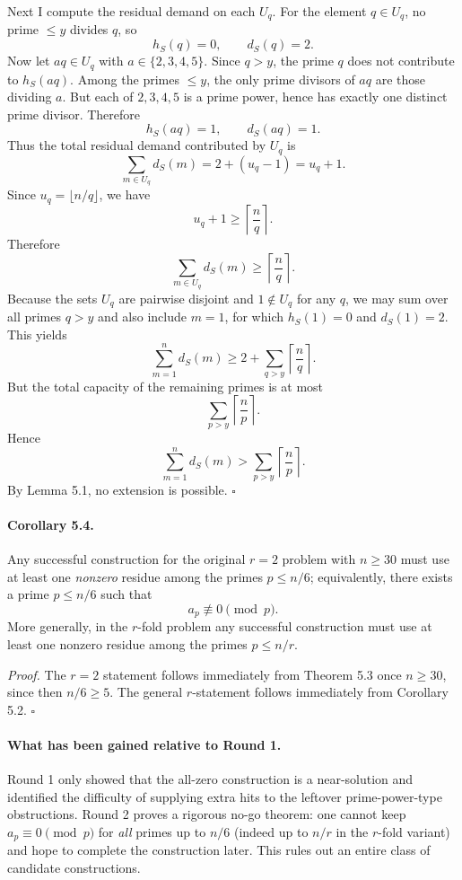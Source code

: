 Next I compute the residual demand on each \(U_q\).
For the element \(q\in U_q\), no prime \(\le y\) divides \(q\), so
\[
h_S(q)=0,
\qquad d_S(q)=2.
\]
Now let \(aq\in U_q\) with \(a\in\{2,3,4,5\}\).
Since \(q>y\), the prime \(q\) does not contribute to \(h_S(aq)\).
Among the primes \(\le y\), the only prime divisors of \(aq\) are those dividing \(a\).
But each of \(2,3,4,5\) is a prime power, hence has exactly one distinct prime divisor.
Therefore
\[
h_S(aq)=1,
\qquad d_S(aq)=1.
\]
Thus the total residual demand contributed by \(U_q\) is
\[
\sum_{m\in U_q} d_S(m)=2+(u_q-1)=u_q+1.
\]
Since \(u_q=\lfloor n/q\rfloor\), we have
\[
u_q+1\ge \left\lceil\frac{n}{q}\right\rceil.
\]
Therefore
\[
\sum_{m\in U_q} d_S(m)
\ge
\left\lceil\frac{n}{q}\right\rceil.
\]
Because the sets \(U_q\) are pairwise disjoint and \(1\notin U_q\) for any \(q\), we may sum over all primes \(q>y\) and also include \(m=1\), for which \(h_S(1)=0\) and \(d_S(1)=2\). This yields
\[
\sum_{m=1}^n d_S(m)
\ge
2+\sum_{q>y}\left\lceil\frac{n}{q}\right\rceil.
\]
But the total capacity of the remaining primes is at most
\[
\sum_{p>y}\left\lceil\frac{n}{p}\right\rceil.
\]
Hence
\[
\sum_{m=1}^n d_S(m)
>
\sum_{p>y}\left\lceil\frac{n}{p}\right\rceil.
\]
By Lemma 5.1, no extension is possible.
\hfill$\square$

\paragraph{Corollary 5.4.}
Any successful construction for the original \(r=2\) problem with \(n\ge 30\) must use at least one \emph{nonzero} residue among the primes \(p\le n/6\); equivalently, there exists a prime \(p\le n/6\) such that
\[
a_p\not\equiv 0\pmod p.
\]
More generally, in the \(r\)-fold problem any successful construction must use at least one nonzero residue among the primes \(p\le n/r\).

\emph{Proof.}
The \(r=2\) statement follows immediately from Theorem 5.3 once \(n\ge 30\), since then \(n/6\ge 5\).
The general \(r\)-statement follows immediately from Corollary 5.2.
\hfill$\square$

\paragraph{What has been gained relative to Round 1.}
Round 1 only showed that the all-zero construction is a near-solution and identified the difficulty of supplying extra hits to the leftover prime-power-type obstructions.
Round 2 proves a rigorous no-go theorem: one cannot keep \(a_p\equiv 0\pmod p\) for \emph{all} primes up to \(n/6\) (indeed up to \(n/r\) in the \(r\)-fold variant) and hope to complete the construction later.
This rules out an entire class of candidate constructions.

